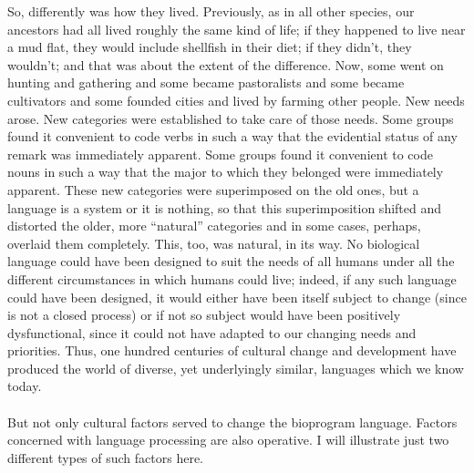 So, differently was how they lived. Previously, as in all other species, our ancestors had all lived roughly the same kind of life; if they happened to live near a mud flat, they would include shellfish in their diet; if they didn't, they wouldn't; and that was about the extent of the difference. Now, some went on hunting and gathering and some became pastoralists and some became cultivators and some founded cities and lived by farming other people. New needs arose. New categories were established to take care of those needs. Some groups found it convenient to code verbs in such a way that the evidential status of any remark was immediately apparent. Some groups found it convenient to code nouns in such a way that the major 
to which they belonged were immediately apparent. These new categories were superimposed on the old ones, but a language is a system or it is nothing, so that this superimposition shifted and distorted the older, more ``natural'' categories and in some cases, perhaps, overlaid them completely. This, too, was natural, in its way. No biological language could have been designed to suit the needs of all humans under all the different circumstances in which humans could live; indeed, if any such language could have been designed, it would either have been itself subject to change (since  is not a closed process) or if not so subject would have been positively dysfunctional, since it could not have adapted to our changing needs and priorities. Thus, one hundred centuries of cultural change and development have produced the world of diverse, yet underlyingly similar, languages which we know today.\\\\

But not only cultural factors served to change the bioprogram language. Factors concerned with language processing are also operative. I will illustrate just two different types of such factors here.

